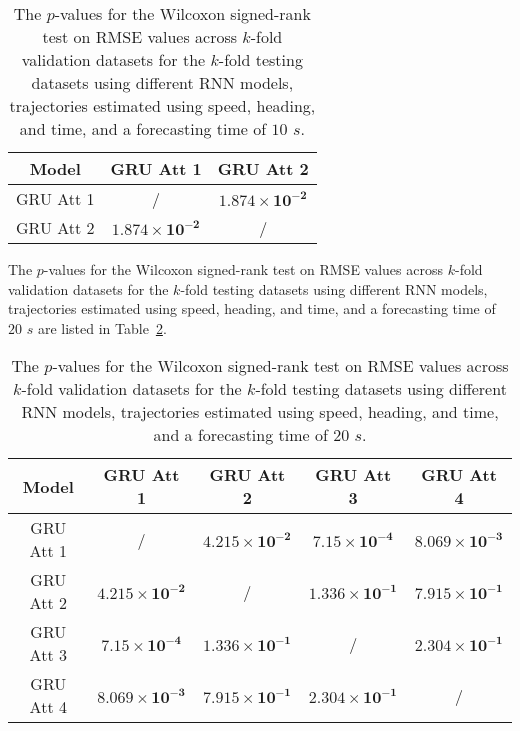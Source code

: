 \begin{table}[!ht]
	\centering
	\begin{tabular}{|c|c|c|}
		\hline
		Model & GRU Att 1 & GRU Att 2 \\ \hline
		GRU Att 1 & / & $\mathbf{1.874 \times 10^{-2}}$ \\ \hline
		GRU Att 2 & $\mathbf{1.874 \times 10^{-2}}$ & / \\ \hline
	\end{tabular}
	\caption{The $p$-values for the Wilcoxon signed-rank test on RMSE values across $k$-fold validation datasets for the $k$-fold testing datasets using different RNN models, trajectories estimated using speed, heading, and time, and a forecasting time of $10$ $s$.}
	\label{tab:RMSE:speed:actual:dir:p:10}
\end{table}

The $p$-values for the Wilcoxon signed-rank test on RMSE values across $k$-fold validation datasets for the $k$-fold testing datasets using different RNN models, trajectories estimated using speed, heading, and time, and a forecasting time of $20$ $s$ are listed in Table~\ref{tab:RMSE:speed:actual:dir:p:20}.

\begin{table}[!ht]
	\centering
	\begin{tabular}{|c|c|c|c|c|}
		\hline
		Model & GRU Att 1 & GRU Att 2 & GRU Att 3 & GRU Att 4 \\ \hline
		GRU Att 1 & / & $\mathbf{4.215 \times 10^{-2}}$ & $\mathbf{7.15 \times 10^{-4}}$ & $\mathbf{8.069 \times 10^{-3}}$ \\ \hline
		GRU Att 2 & $\mathbf{4.215 \times 10^{-2}}$ & / & $\mathbf{1.336 \times 10^{-1}}$ & $\mathbf{7.915 \times 10^{-1}}$ \\ \hline
		GRU Att 3 & $\mathbf{7.15 \times 10^{-4}}$ & $\mathbf{1.336 \times 10^{-1}}$ & / & $\mathbf{2.304 \times 10^{-1}}$ \\ \hline
		GRU Att 4 & $\mathbf{8.069 \times 10^{-3}}$ & $\mathbf{7.915 \times 10^{-1}}$ & $\mathbf{2.304 \times 10^{-1}}$ & / \\ \hline
	\end{tabular}
	\caption{The $p$-values for the Wilcoxon signed-rank test on RMSE values across $k$-fold validation datasets for the $k$-fold testing datasets using different RNN models, trajectories estimated using speed, heading, and time, and a forecasting time of $20$ $s$.}
	\label{tab:RMSE:speed:actual:dir:p:20}
\end{table}

